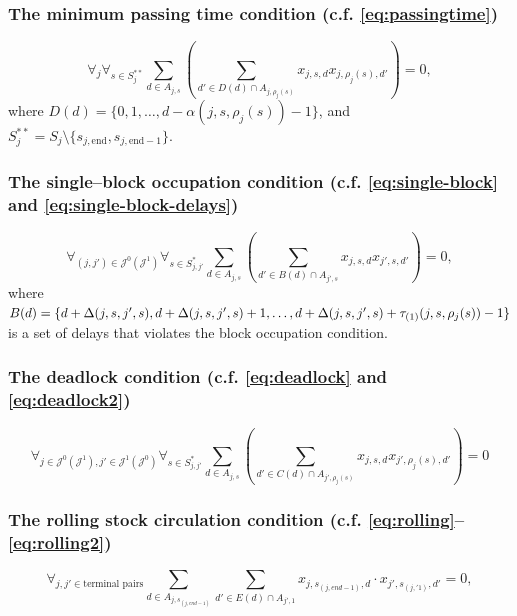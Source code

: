 \subsubsection{The minimum passing time condition (c.f. \eqref{eq:passingtime})}
\begin{equation}
  \label{eq:passingtime-binary}
\forall_{j} \forall_{s \in S_j^{**}}
\sum_{d \in A_{j,s}}
\left(
\sum_{ d' \in D(d) \cap A_{j, \rho_j(s)}} x_{j, s, d}
x_{j, \rho_j(s), d'} \right) = 0,
\end{equation}
where $D(d) = \{0, 1, \ldots, d - \alpha(j, s, \rho_j(s)) -1\}$, and
$S_j^{**} = S_j \setminus \{s_{j, \text{end}}, s_{j, \text{end}-1}\}$.

\subsubsection{The single--block occupation condition (c.f. \eqref{eq:single-block} and \eqref{eq:single-block-delays})}
\begin{equation}
  \label{eq:singleblock-binary}
\forall_{(j,j') \in \mathcal{J}^0 (\mathcal{J}^1)}
\forall_{s \in S^*_{j,j'}}
\sum_{d \in A_{j,s}}\left(\sum_{d' \in B(d) \cap A_{j', s}}
x_{j, s, d} x_{j', s, d'}\right) = 0,
\end{equation}
where $B(d) = \{d + \Delta(j, s, j', s), d + \Delta(j, s, j', s)+ 1,\ldots, d +
\Delta(j,
s, j', s) + \\ \tau_{(1)}(j,s, \rho_j(s))-1
\}$ is a set of delays that violates the block occupation condition.
\subsubsection{The deadlock condition (c.f. \eqref{eq:deadlock} and \eqref{eq:deadlock2})}
\begin{equation}
  \label{eq:deadlock-binary}
  \forall_{j \in \mathcal{J}^0(\mathcal{J}^1),  j' \in
\mathcal{J}^1(\mathcal{J}^0) }
\forall_{s \in S^*_{j,j'}}
\sum_{d \in A_{j,s}}\left(\sum_{d' \in C(d) \cap A_{j', \rho_j(s)}}
x_{j, s, d}
x_{j', \rho_j(s), d'}\right) = 0
\end{equation}
\subsubsection{The rolling stock circulation condition (c.f. \eqref{eq:rolling}--\eqref{eq:rolling2})}
\begin{equation}
  \label{eq:rollingstock}
    \forall_{j,j' \in \text{terminal pairs}}
  \sum_{d \in A_{j,s_{(j, end-1)}}}
  \sum_{ d' \in E(d) \cap A_{j', 1}} x_{j, s_{(j, end-1)}, d}
  \cdot x_{j', s_{(j,' 1)}, d'}  = 0,
\end{equation}



